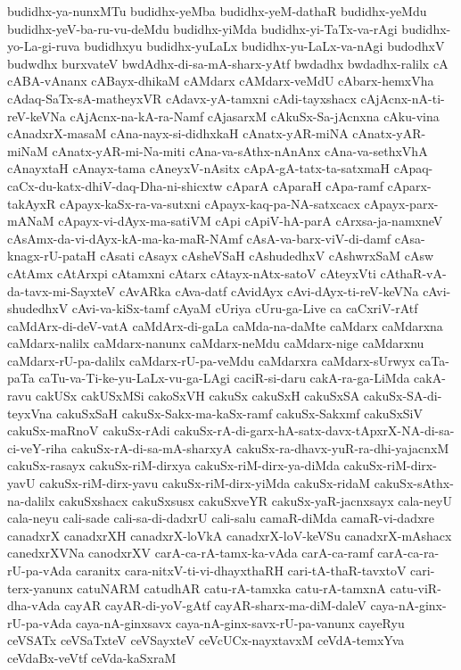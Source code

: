 {budidhx-ya-nunxMTu
budidhx-yeMba
budidhx-yeM-dathaR
budidhx-yeMdu
budidhx-yeV-ba-ru-vu-deMdu
budidhx-yiMda
budidhx-yi-TaTx-va-rAgi
budidhx-yo-La-gi-ruva
budidhxyu
budidhx-yuLaLx
budidhx-yu-LaLx-va-nAgi
budodhxV
budwdhx
burxvateV
bwdAdhx-di-sa-mA-sharx-yAtf
bwdadhx
bwdadhx-ralilx
cA
cABA-vAnanx
cABayx-dhikaM
cAMdarx
cAMdarx-veMdU
cAbarx-hemxVha
cAdaq-SaTx-sA-matheyxVR
cAdavx-yA-tamxni
cAdi-tayxshacx
cAjAcnx-nA-ti-reV-keVNa
cAjAcnx-na-kA-ra-Namf
cAjasarxM
cAkuSx-Sa-jAcnxna
cAku-vina
cAnadxrX-masaM
cAna-nayx-si-didhxkaH
cAnatx-yAR-miNA
cAnatx-yAR-miNaM
cAnatx-yAR-mi-Na-miti
cAna-va-sAthx-nAnAnx
cAna-va-sethxVhA
cAnayxtaH
cAnayx-tama
cAneyxV-nAsitx
cApA-gA-tatx-ta-satxmaH
cApaq-caCx-du-katx-dhiV-daq-Dha-ni-shicxtw
cAparA
cAparaH
cApa-ramf
cAparx-takAyxR
cApayx-kaSx-ra-va-sutxni
cApayx-kaq-pa-NA-satxcacx
cApayx-parx-mANaM
cApayx-vi-dAyx-ma-satiVM
cApi
cApiV-hA-parA
cArxsa-ja-namxneV
cAsAmx-da-vi-dAyx-kA-ma-ka-maR-NAmf
cAsA-va-barx-viV-di-damf
cAsa-knagx-rU-pataH
cAsati
cAsayx
cAsheVSaH
cAshudedhxV
cAshwrxSaM
cAsw
cAtAmx
cAtArxpi
cAtamxni
cAtarx
cAtayx-nAtx-satoV
cAteyxVti
cAthaR-vA-da-tavx-mi-SayxteV
cAvARka
cAva-datf
cAvidAyx
cAvi-dAyx-ti-reV-keVNa
cAvi-shudedhxV
cAvi-va-kiSx-tamf
cAyaM
cUriya
cUru-ga-Live
ca
caCxriV-rAtf
caMdArx-di-deV-vatA
caMdArx-di-gaLa
caMda-na-daMte
caMdarx
caMdarxna
caMdarx-nalilx
caMdarx-nanunx
caMdarx-neMdu
caMdarx-nige
caMdarxnu
caMdarx-rU-pa-dalilx
caMdarx-rU-pa-veMdu
caMdarxra
caMdarx-sUrwyx
caTa-paTa
caTu-va-Ti-ke-yu-LaLx-vu-ga-LAgi
caciR-si-daru
cakA-ra-ga-LiMda
cakA-ravu
cakUSx
cakUSxMSi
cakoSxVH
cakuSx
cakuSxH
cakuSxSA
cakuSx-SA-di-teyxVna
cakuSxSaH
cakuSx-Sakx-ma-kaSx-ramf
cakuSx-Sakxmf
cakuSxSiV
cakuSx-maRnoV
cakuSx-rAdi
cakuSx-rA-di-garx-hA-satx-davx-tApxrX-NA-di-sa-ci-veY-riha
cakuSx-rA-di-sa-mA-sharxyA
cakuSx-ra-dhavx-yuR-ra-dhi-yajacnxM
cakuSx-rasayx
cakuSx-riM-dirxya
cakuSx-riM-dirx-ya-diMda
cakuSx-riM-dirx-yavU
cakuSx-riM-dirx-yavu
cakuSx-riM-dirx-yiMda
cakuSx-ridaM
cakuSx-sAthx-na-dalilx
cakuSxshacx
cakuSxsusx
cakuSxveYR
cakuSx-yaR-jacnxsayx
cala-neyU
cala-neyu
cali-sade
cali-sa-di-dadxrU
cali-salu
camaR-diMda
camaR-vi-dadxre
canadxrX
canadxrXH
canadxrX-loVkA
canadxrX-loV-keVSu
canadxrX-mAshacx
canedxrXVNa
canodxrXV
carA-ca-rA-tamx-ka-vAda
carA-ca-ramf
carA-ca-ra-rU-pa-vAda
caranitx
cara-nitxV-ti-vi-dhayxthaRH
cari-tA-thaR-tavxtoV
cari-terx-yanunx
catuNARM
catudhAR
catu-rA-tamxka
catu-rA-tamxnA
catu-viR-dha-vAda
cayAR
cayAR-di-yoV-gAtf
cayAR-sharx-ma-diM-daleV
caya-nA-ginx-rU-pa-vAda
caya-nA-ginxsavx
caya-nA-ginx-savx-rU-pa-vanunx
cayeRyu
ceVSATx
ceVSaTxteV
ceVSayxteV
ceVcUCx-nayxtavxM
ceVdA-temxYva
ceVdaBx-veVtf
ceVda-kaSxraM
}
